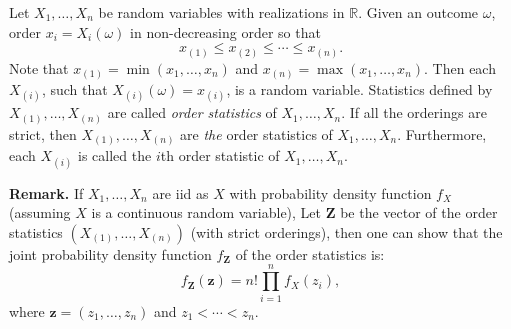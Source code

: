 \documentclass[12pt]{article}
\begin{document}
Let $X_1,\ldots,X_n$ be random variables with realizations in $\mathbb{R}$.  Given an outcome $\omega$, order $x_i=X_i(\omega)$ in non-decreasing order so that 
$$x_{(1)}\leq x_{(2)}\leq\cdots\leq x_{(n)}.$$
Note that $x_{(1)}=\operatorname{min}(x_1,\ldots,x_n)$ and $x_{(n)}=\operatorname{max}(x_1,\ldots,x_n)$.  Then each $X_{(i)}$, such that $X_{(i)}(\omega)=x_{(i)}$, is a random variable.  Statistics defined by $X_{(1)},\ldots,X_{(n)}$ are called \emph{order statistics} of $X_1,\ldots,X_n$.  If all the orderings are strict, then $X_{(1)},\ldots,X_{(n)}$ are \emph{the} order statistics of $X_1,\ldots,X_n$.  Furthermore, each $X_{(i)}$ is called the $i$th order statistic of $X_1,\ldots,X_n$.
\par
\textbf{Remark.}
If $X_1,\ldots,X_n$ are iid as $X$ with probability density function $f_X$ (assuming $X$ is a continuous random variable), Let $\textbf{Z}$ be the vector of the order statistics $(X_{(1)},\ldots,X_{(n)})$ (with strict orderings), then one can show that the joint probability density function $f_{\textbf{Z}}$ of the order statistics is:
$$f_{\textbf{Z}}(\boldsymbol{z})=n!\prod_{i=1}^{n}f_X(z_i),$$
where $\boldsymbol{z}=(z_1,\ldots,z_n)$ and $z_1<\cdots<z_n$.
\end{document}
